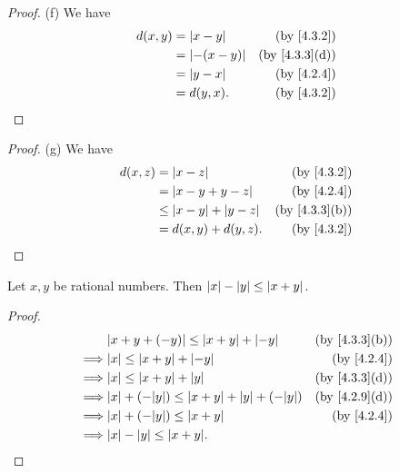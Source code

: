 \begin{proof}{(f)}
  We have
  \begin{align*}
    d(x, y) & = \abs{x - y}    & \text{(by \cref{4.3.2})}    \\
            & = \abs{-(x - y)} & \text{(by \cref{4.3.3}(d))} \\
            & = \abs{y - x}    & \text{(by \cref{4.2.4})}    \\
            & = d(y, x).       & \text{(by \cref{4.3.2})}
  \end{align*}
\end{proof}

\begin{proof}{(g)}
  We have
  \begin{align*}
    d(x, z) & = \abs{x - z}                  & \text{(by \cref{4.3.2})}    \\
            & = \abs{x - y + y - z}          & \text{(by \cref{4.2.4})}    \\
            & \leq \abs{x - y} + \abs{y - z} & \text{(by \cref{4.3.3}(b))} \\
            & = d(x, y) + d(y, z).           & \text{(by \cref{4.3.2})}    \\
  \end{align*}
\end{proof}

\begin{additional corollary}\label{ac 4.3.1}
Let \(x, y\) be rational numbers.
Then \(\left\lvert x\right\rvert - \left\lvert y\right\rvert \leq \left\lvert x + y\right\rvert\).
\end{additional corollary}

\begin{proof}
  \begin{align*}
             & \abs{x + y + (-y)} \leq \abs{x + y} + \abs{-y}               & \text{(by \cref{4.3.3}(b))} \\
    \implies & \abs{x} \leq \abs{x + y} + \abs{-y}                          & \text{(by \cref{4.2.4})}    \\
    \implies & \abs{x} \leq \abs{x + y} + \abs{y}                           & \text{(by \cref{4.3.3}(d))} \\
    \implies & \abs{x} + (-\abs{y}) \leq \abs{x + y} + \abs{y} + (-\abs{y}) & \text{(by \cref{4.2.9}(d))} \\
    \implies & \abs{x} + (-\abs{y}) \leq \abs{x + y}                        & \text{(by \cref{4.2.4})}    \\
    \implies & \abs{x} - \abs{y} \leq \abs{x + y}.
  \end{align*}
\end{proof}

